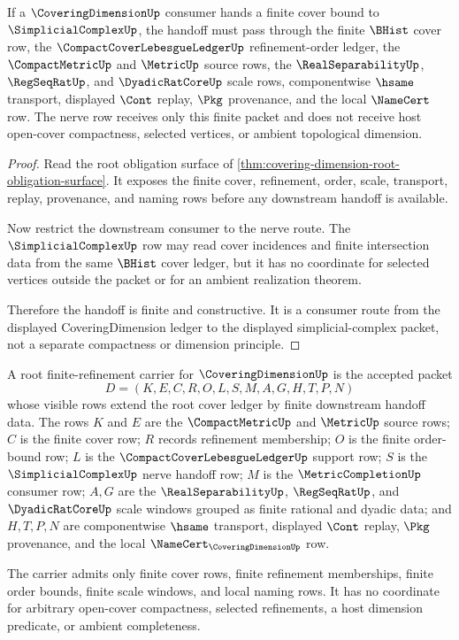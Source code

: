 \begin{theorem}
\label{thm:covering-dimension-simplicial-nerve-handoff}
If a $\CoveringDimensionUp$ consumer hands a finite cover bound to $\SimplicialComplexUp$, the handoff must pass through the finite $\BHist$ cover row, the $\CompactCoverLebesgueLedgerUp$ refinement-order ledger, the $\CompactMetricUp$ and $\MetricUp$ source rows, the $\RealSeparabilityUp$, $\RegSeqRatUp$, and $\DyadicRatCoreUp$ scale rows, componentwise $\hsame$ transport, displayed $\Cont$ replay, $\Pkg$ provenance, and the local $\NameCert$ row. The nerve row receives only this finite packet and does not receive host open-cover compactness, selected vertices, or ambient topological dimension.
\end{theorem}
\begin{proof}
Read the root obligation surface of \autoref{thm:covering-dimension-root-obligation-surface}. It exposes the finite cover, refinement, order, scale, transport, replay, provenance, and naming rows before any downstream handoff is available.

Now restrict the downstream consumer to the nerve route. The $\SimplicialComplexUp$ row may read cover incidences and finite intersection data from the same $\BHist$ cover ledger, but it has no coordinate for selected vertices outside the packet or for an ambient realization theorem.

Therefore the handoff is finite and constructive. It is a consumer route from the displayed CoveringDimension ledger to the displayed simplicial-complex packet, not a separate compactness or dimension principle.
\end{proof}

\begin{definition}
\label{def:covering-dimension-finite-refinement-carrier}
A root finite-refinement carrier for $\CoveringDimensionUp$ is the accepted packet
$$
D=(K,E,C,R,O,L,S,M,A,G,H,T,P,N)
$$
whose visible rows extend the root cover ledger by finite downstream handoff data. The rows $K$ and $E$ are the $\CompactMetricUp$ and $\MetricUp$ source rows; $C$ is the finite cover row; $R$ records refinement membership; $O$ is the finite order-bound row; $L$ is the $\CompactCoverLebesgueLedgerUp$ support row; $S$ is the $\SimplicialComplexUp$ nerve handoff row; $M$ is the $\MetricCompletionUp$ consumer row; $A,G$ are the $\RealSeparabilityUp$, $\RegSeqRatUp$, and $\DyadicRatCoreUp$ scale windows grouped as finite rational and dyadic data; and $H,T,P,N$ are componentwise $\hsame$ transport, displayed $\Cont$ replay, $\Pkg$ provenance, and the local $\NameCert_{\CoveringDimensionUp}$ row.

The carrier admits only finite cover rows, finite refinement memberships, finite order bounds, finite scale windows, and local naming rows. It has no coordinate for arbitrary open-cover compactness, selected refinements, a host dimension predicate, or ambient completeness.
\end{definition}

